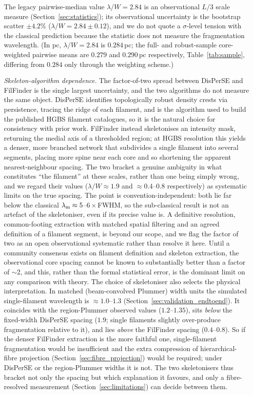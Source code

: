\documentclass[usenatbib,twoside,twocolumn]{mnras}
\begin{document}
The legacy pairwise-median value $\lambda/W=2.84$ is an observational $L/3$ scale measure (Section~\ref{sec:statistics}); its observational uncertainty is the bootstrap scatter $\pm4.2\%$ ($\lambda/W=2.84\pm0.12$), and we do not quote a $\sigma$-level tension with the classical prediction because the statistic does not measure the fragmentation wavelength. (In pc, $\lambda/W=2.84$ is $0.284$\,pc; the full- and robust-sample core-weighted pairwise means are $0.279$ and $0.290$\,pc respectively, Table~\ref{tab:sample}, differing from $0.284$ only through the weighting scheme.)

\emph{Skeleton-algorithm dependence.} The factor-of-two spread between DisPerSE and FilFinder is the single largest uncertainty, and the two algorithms do not measure the same object. DisPerSE identifies topologically robust density crests via persistence, tracing the ridge of each filament, and is the algorithm used to build the published HGBS filament catalogues, so it is the natural choice for consistency with prior work. FilFinder instead skeletonises an intensity mask, returning the medial axis of a thresholded region; at HGBS resolution this yields a denser, more branched network that subdivides a single filament into several segments, placing more spine near each core and so shortening the apparent nearest-neighbour spacing. The two bracket a genuine ambiguity in what constitutes ``the filament'' at these scales, rather than one being simply wrong, and we regard their values ($\lambda/W\approx1.9$ and $\approx0.4$--$0.8$ respectively) as systematic limits on the true spacing. The point is convention-independent: both lie far below the classical $\lambda_{\rm m}\approx5$--$6\times$FWHM, so the sub-classical result is not an artefact of the skeletoniser, even if its precise value is. A definitive resolution, common-footing extraction with matched spatial filtering and an agreed definition of a filament segment, is beyond our scope, and we flag the factor of two as an open observational systematic rather than resolve it here. Until a community consensus exists on filament definition and skeleton extraction, the observational core spacing cannot be known to substantially better than a factor of $\sim$2, and this, rather than the formal statistical error, is the dominant limit on any comparison with theory. The choice of skeletoniser also selects the physical interpretation. In matched (beam-convolved Plummer) width units the simulated single-filament wavelength is $\approx1.0$--$1.3$ (Section~\ref{sec:validation_endtoend}). It coincides with the region-Plummer observed values ($1.2$--$1.35$), sits \emph{below} the fixed-width DisPerSE spacing ($1.9$; single filaments slightly over-produce fragmentation relative to it), and lies \emph{above} the FilFinder spacing ($0.4$--$0.8$). So if the denser FilFinder extraction is the more faithful one, single-filament fragmentation would be insufficient and the extra compression of hierarchical-fibre projection (Section~\ref{sec:fibre_projection}) would be required; under DisPerSE or the region-Plummer widths it is not. The two skeletonisers thus bracket not only the spacing but which explanation it favours, and only a fibre-resolved measurement (Section~\ref{sec:limitations}) can decide between them.
\end{document}

